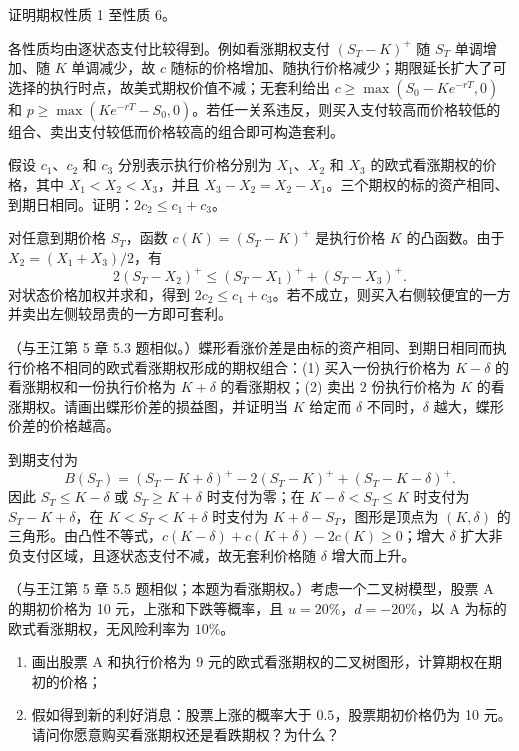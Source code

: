 \begin{problem}
 证明期权性质 1 至性质 6。
\end{problem}
\begin{solution}
各性质均由逐状态支付比较得到。例如看涨期权支付 $(S_T-K)^+$ 随 $S_T$ 单调增加、随 $K$ 单调减少，故 $c$ 随标的价格增加、随执行价格减少；期限延长扩大了可选择的执行时点，故美式期权价值不减；无套利给出 $c\ge\max(S_0-Ke^{-rT},0)$ 和 $p\ge\max(Ke^{-rT}-S_0,0)$。若任一关系违反，则买入支付较高而价格较低的组合、卖出支付较低而价格较高的组合即可构造套利。
\end{solution}
\begin{problem}
 假设 $c_1$、$c_2$ 和 $c_3$ 分别表示执行价格分别为 $X_1$、$X_2$ 和 $X_3$ 的欧式看涨期权的价格，其中 $X_1<X_2<X_3$，并且 $X_3-X_2=X_2-X_1$。三个期权的标的资产相同、到期日相同。证明：$2c_2\le c_1+c_3$。
\end{problem}
\begin{solution}
对任意到期价格 $S_T$，函数 $c(K)=(S_T-K)^+$ 是执行价格 $K$ 的凸函数。由于 $X_2=(X_1+X_3)/2$，有
\[
2(S_T-X_2)^+\le(S_T-X_1)^++(S_T-X_3)^+.
\]
对状态价格加权并求和，得到 $2c_2\le c_1+c_3$。若不成立，则买入右侧较便宜的一方并卖出左侧较昂贵的一方即可套利。
\end{solution}
\begin{problem}
（与王江第 5 章 5.3 题相似。）蝶形看涨价差是由标的资产相同、到期日相同而执行价格不相同的欧式看涨期权形成的期权组合：(1) 买入一份执行价格为 $K-\delta$ 的看涨期权和一份执行价格为 $K+\delta$ 的看涨期权；(2) 卖出 $2$ 份执行价格为 $K$ 的看涨期权。请画出蝶形价差的损益图，并证明当 $K$ 给定而 $\delta$ 不同时，$\delta$ 越大，蝶形价差的价格越高。
\end{problem}
\begin{solution}
到期支付为
\[
B(S_T)=(S_T-K+\delta)^+-2(S_T-K)^++(S_T-K-\delta)^+.
\]
因此 $S_T\le K-\delta$ 或 $S_T\ge K+\delta$ 时支付为零；在 $K-\delta<S_T\le K$ 时支付为 $S_T-K+\delta$，在 $K<S_T<K+\delta$ 时支付为 $K+\delta-S_T$，图形是顶点为 $(K,\delta)$ 的三角形。由凸性不等式，$c(K-\delta)+c(K+\delta)-2c(K)\ge0$；增大 $\delta$ 扩大非负支付区域，且逐状态支付不减，故无套利价格随 $\delta$ 增大而上升。
\end{solution}
\begin{problem}
（与王江第 5 章 5.5 题相似；本题为看涨期权。）考虑一个二叉树模型，股票 A 的期初价格为 \num{10} 元，上涨和下跌等概率，且 $u=20\%$，$d=-20\%$，以 A 为标的欧式看涨期权，无风险利率为 $10\%$。
\begin{enumerate}[label=(\alph*)]
    \item 画出股票 A 和执行价格为 \num{9} 元的欧式看涨期权的二叉树图形，计算期权在期初的价格；
    \item 假如得到新的利好消息：股票上涨的概率大于 $0.5$，股票期初价格仍为 \num{10} 元。请问你愿意购买看涨期权还是看跌期权？为什么？
\end{enumerate}
\end{problem}
